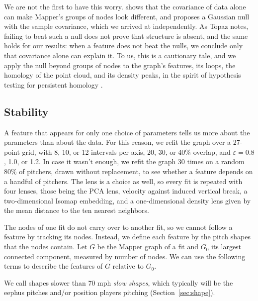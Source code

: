 \documentclass[11pt]{article}
\theoremstyle{definition}
\theoremstyle{remark}
\begin{document}
We are not the first to have this worry.
\textcite{topaz2026null} shows that the covariance of data alone can make Mapper's groups of nodes look different, and proposes a Gaussian null with the sample covariance, which we arrived at independently.
As Topaz notes, failing to beat such a null does not prove that structure is absent, and the same holds for our results: when a feature does not beat the nulls, we conclude only that covariance alone can explain it.
To us, this is a cautionary tale, and we apply the null beyond groups of nodes to the graph's features, its loops, the homology of the point cloud, and its density peaks, in the spirit of hypothesis testing for persistent homology \parencite{robinsonturner2017,blumberg2014}.

\subsection{Stability}
A feature that appears for only one choice of parameters tells us more about the parameters than about the data.
For this reason, we refit the graph over a 27-point grid, with 8, 10, or 12 intervals per axis, 20, 30, or 40\% overlap, and $\varepsilon = 0.8$, 1.0, or 1.2.
In case it wasn't enough, we refit the graph 30 times on a random 80\% of pitchers, drawn without replacement, to see whether a feature depends on a handful of pitchers.
The lens is a choice as well, so every fit is repeated with four lenses, those being the PCA lens, velocity against induced vertical break, a two-dimensional Isomap embedding, and a one-dimensional density lens given by the mean distance to the ten nearest neighbors.

The nodes of one fit do not carry over to another fit, so we cannot follow a feature by tracking its nodes. Instead, we define each feature by the pitch shapes that the nodes contain.
Let $G$ be the Mapper graph of a fit and $G_0$ its largest connected component, measured by number of nodes. We can use the following terms to describe the features of $G$ relative to $G_0$.

We call shapes slower than 70 mph \emph{slow shapes}, which typically will be the eephus pitches and/or position players pitching (Section~\ref{sec:shape}).
\end{document}
